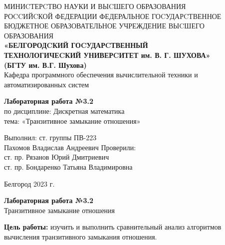 \documentclass[a4paper,14pt]{extarticle}
\newcommand\textbox[1]{
	\parbox{.45\textwidth}{#1}
}
\begin{document}
\begin{center}
	\small{
		МИНИCТЕРCТВО НАУКИ И ВЫCШЕГО ОБРАЗОВАНИЯ \\РОCCИЙCКОЙ ФЕДЕРАЦИИ
		\bigbreak
		ФЕДЕРАЛЬНОЕ ГОCУДАРCТВЕННОЕ БЮДЖЕТНОЕ ОБРАЗОВАТЕЛЬНОЕ УЧРЕЖДЕНИЕ ВЫCШЕГО ОБРАЗОВАНИЯ \\
		\bigbreak
		\textbf{«БЕЛГОРОДCКИЙ ГОCУДАРCТВЕННЫЙ \\ТЕХНОЛОГИЧЕCКИЙ УНИВЕРCИТЕТ им. В. Г. ШУХОВА»\\ (БГТУ им. В.Г. Шухова)} \\
		\bigbreak
		Кафедра программного обеспечения вычислительной техники и автоматизированных систем\\}
\end{center}

\vfill
\begin{center}
	\large{
		\textbf{
			Лабораторная работа №3.2}}\\
	\normalsize{
		по дисциплине: Дискретная математика \\
		тема: «Транзитивное замыкание отношения»}
\end{center}
\vfill
\hfill\textbox{
	Выполнил: ст. группы ПВ-223\\Пахомов Владислав Андреевич
	\bigbreak
	Проверили: \\ст. пр. Рязанов Юрий Дмитриевич\\
	ст. пр. Бондаренко Татьяна Владимировна
}
\vfill\begin{center}
	Белгород 2023 г.
\end{center}
\newpage
\begin{center}
	\textbf{Лабораторная работа №3.2}\\
	Транзитивное замыкание отношения
\end{center}
\textbf{Цель работы: }изучить и выполнить сравнительный анализ алгоритмов
вычисления транзитивного замыкания отношения.
\end{document}
